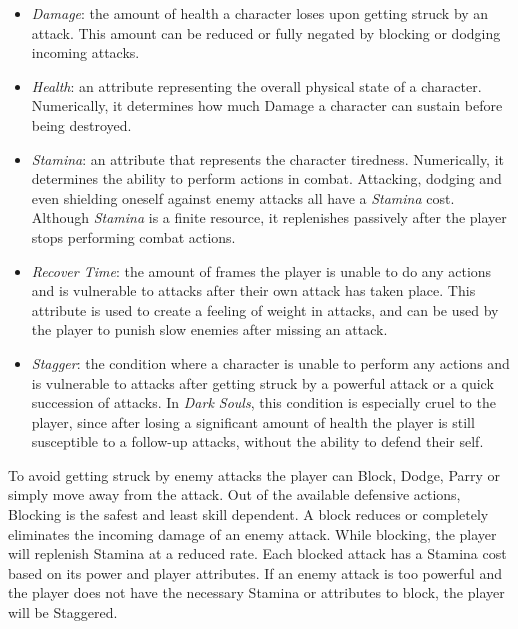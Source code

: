 \begin{itemize}

\item \emph{Damage}: the amount of health a character loses upon getting struck by an attack. This amount can be reduced or fully negated by blocking or dodging incoming attacks.

\item \emph{Health}: an attribute representing the overall physical state of a character. Numerically, it determines how much Damage a character can sustain before being destroyed.

\item \emph{Stamina}: an attribute that represents the character tiredness. Numerically, it determines the ability to perform actions in combat. Attacking, dodging and even shielding oneself against enemy attacks all have a \emph{Stamina} cost. Although \emph{Stamina} is a finite resource, it replenishes passively after the player stops performing combat actions.

\item \emph{Recover Time}: the amount of frames the player is unable to do any actions and is vulnerable to attacks after their own attack has taken place. This attribute is used to create a feeling of weight in attacks, and can be used by the player to punish slow enemies after missing an attack.

\item \emph{Stagger}: the condition where a character is unable to perform any actions and is vulnerable to attacks after getting struck by a powerful attack or a quick succession of attacks. In \emph{Dark Souls}, this condition is especially cruel to the player, since after losing a significant amount of health the player is still susceptible to a follow-up attacks, without the ability to defend their self.

\end{itemize}


To avoid getting struck by enemy attacks the player can Block, Dodge, Parry or simply move away from the attack. Out of the available defensive actions, Blocking is the safest and least skill dependent. A block reduces or completely eliminates the incoming damage of an enemy attack. While blocking, the player will replenish Stamina at a reduced rate. Each blocked attack has a Stamina cost based on its power and player attributes. If an enemy attack is too powerful and the player does not have the necessary Stamina or attributes to block, the player will be Staggered.

